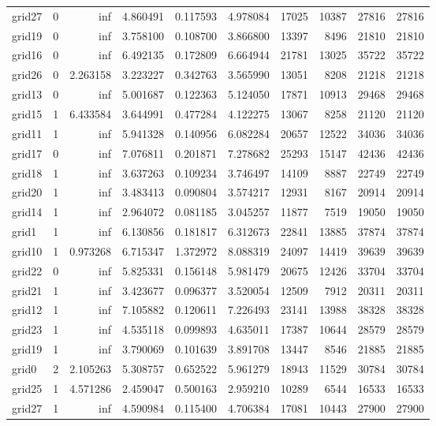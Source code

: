 \begin{longtable}{|l|r|r|r|r|r|r|r|r|r|}
grid27 & 0 & inf & 4.860491 & 0.117593 & 4.978084 & 17025 & 10387 & 27816 & 27816 \\
grid19 & 0 & inf & 3.758100 & 0.108700 & 3.866800 & 13397 & 8496 & 21810 & 21810 \\
grid16 & 0 & inf & 6.492135 & 0.172809 & 6.664944 & 21781 & 13025 & 35722 & 35722 \\
grid26 & 0 & 2.263158 & 3.223227 & 0.342763 & 3.565990 & 13051 & 8208 & 21218 & 21218 \\
grid13 & 0 & inf & 5.001687 & 0.122363 & 5.124050 & 17871 & 10913 & 29468 & 29468 \\
grid15 & 1 & 6.433584 & 3.644991 & 0.477284 & 4.122275 & 13067 & 8258 & 21120 & 21120 \\
grid11 & 1 & inf & 5.941328 & 0.140956 & 6.082284 & 20657 & 12522 & 34036 & 34036 \\
grid17 & 0 & inf & 7.076811 & 0.201871 & 7.278682 & 25293 & 15147 & 42436 & 42436 \\
grid18 & 1 & inf & 3.637263 & 0.109234 & 3.746497 & 14109 & 8887 & 22749 & 22749 \\
grid20 & 1 & inf & 3.483413 & 0.090804 & 3.574217 & 12931 & 8167 & 20914 & 20914 \\
grid14 & 1 & inf & 2.964072 & 0.081185 & 3.045257 & 11877 & 7519 & 19050 & 19050 \\
grid1 & 1 & inf & 6.130856 & 0.181817 & 6.312673 & 22841 & 13885 & 37874 & 37874 \\
grid10 & 1 & 0.973268 & 6.715347 & 1.372972 & 8.088319 & 24097 & 14419 & 39639 & 39639 \\
grid22 & 0 & inf & 5.825331 & 0.156148 & 5.981479 & 20675 & 12426 & 33704 & 33704 \\
grid21 & 1 & inf & 3.423677 & 0.096377 & 3.520054 & 12509 & 7912 & 20311 & 20311 \\
grid12 & 1 & inf & 7.105882 & 0.120611 & 7.226493 & 23141 & 13988 & 38328 & 38328 \\
grid23 & 1 & inf & 4.535118 & 0.099893 & 4.635011 & 17387 & 10644 & 28579 & 28579 \\
grid19 & 1 & inf & 3.790069 & 0.101639 & 3.891708 & 13447 & 8546 & 21885 & 21885 \\
grid0 & 2 & 2.105263 & 5.308757 & 0.652522 & 5.961279 & 18943 & 11529 & 30784 & 30784 \\
grid25 & 1 & 4.571286 & 2.459047 & 0.500163 & 2.959210 & 10289 & 6544 & 16533 & 16533 \\
grid27 & 1 & inf & 4.590984 & 0.115400 & 4.706384 & 17081 & 10443 & 27900 & 27900 \\

\end{longtable}
